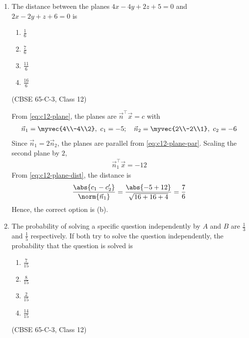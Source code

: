 \begin{enumerate}[label=\thesubsection.\arabic*., ref=\thesubsection.\theenumi]
\solution From \eqref{eq:c12-matsq} and \eqref{eq:c12-matmul-2x2},
\begin{align}
\vec{A}^2 = \myvec{1&-1\\-1&1}\myvec{1&-1\\-1&1}
= \myvec{1+1&-1-1\\-1-1&1+1}
= \myvec{2&-2\\-2&2}
\end{align}
Hence, the correct option is (a).
 
\begin{center}
\end{center}
 
\item The distance between the planes $4x-4y+2z+5=0$ and $2x-2y+z+6=0$ is
\begin{enumerate}
\item $\frac{1}{6}$
\item $\frac{7}{6}$
\item $\frac{11}{6}$
\item $\frac{16}{6}$
\end{enumerate}
\hfill (CBSE 65-C-3, Class 12)
 
\solution From \eqref{eq:c12-plane}, the planes are $\vec{n}^{\top}\vec{x}=c$ with
\begin{align}
\vec{n}_1 = \myvec{4\\-4\\2},\ c_1=-5;\quad
\vec{n}_2 = \myvec{2\\-2\\1},\ c_2=-6
\end{align}
Since $\vec{n}_1 = 2\vec{n}_2$, the planes are parallel from \eqref{eq:c12-plane-par}.
Scaling the second plane by $2$,
\begin{align}
\vec{n}_1^{\top}\vec{x} = -12
\end{align}
From \eqref{eq:c12-plane-dist}, the distance is
\begin{align}
\frac{\abs{c_1-c_2'}}{\norm{\vec{n}_1}}
= \frac{\abs{-5+12}}{\sqrt{16+16+4}} = \frac{7}{6}
\end{align}
Hence, the correct option is (b).
 
\begin{center}
\end{center}
 
\item The probability of solving a specific question independently by $A$ and $B$ are $\frac{1}{3}$ and $\frac{1}{5}$ respectively. If both try to solve the question independently, the probability that the question is solved is
\begin{enumerate}
\item $\frac{7}{15}$
\item $\frac{8}{15}$
\item $\frac{2}{15}$
\item $\frac{14}{15}$
\end{enumerate}
\hfill (CBSE 65-C-3, Class 12)
 

\end{enumerate}
